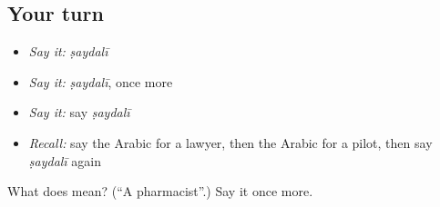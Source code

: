 \subsection*{Your turn}
\begin{itemize}
\raggedright
  \item \emph{Say it:} \emph{ṣaydalī}
  \item \emph{Say it:} \emph{ṣaydalī}, once more
  \item \emph{Say it:} say \emph{ṣaydalī}
  \item \emph{Recall:} say the Arabic for a lawyer, then the Arabic for a pilot, then say \emph{ṣaydalī} again
\end{itemize}

\begin{tcolorbox}[breakable,colback=teal!4,colframe=teal!35!black,title={Before you move on}]
What does  mean? (\textquotedblleft{}A pharmacist\textquotedblright{}.) Say it once more.
\end{tcolorbox}
